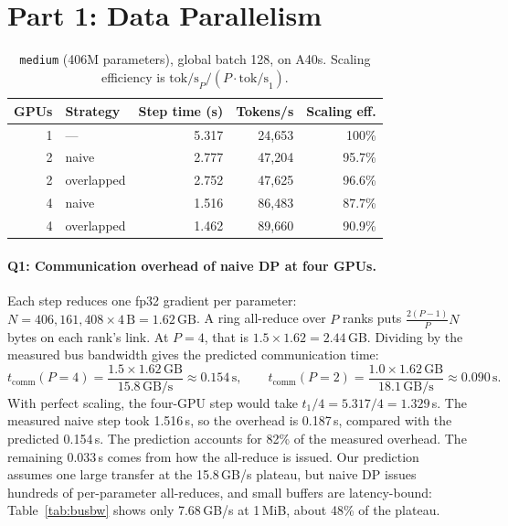 \documentclass[10pt]{article}
\begin{document}
\section{Part 1: Data Parallelism}


\begin{table}[htbp]
\caption{\texttt{medium} (406M parameters), global batch 128, on A40s.
Scaling efficiency is $\text{tok/s}_P / (P \cdot \text{tok/s}_1)$.}
\label{tab:ddp}
\centering
\begin{tabular}{rlrrr}
\toprule
GPUs & Strategy & Step time (s) & Tokens/s & Scaling eff. \\
\midrule
1 & ---        & 5.317 & 24{,}653 & 100\% \\
2 & naive      & 2.777 & 47{,}204 & 95.7\% \\
2 & overlapped & 2.752 & 47{,}625 & 96.6\% \\
4 & naive      & 1.516 & 86{,}483 & 87.7\% \\
4 & overlapped & 1.462 & 89{,}660 & 90.9\% \\
\bottomrule
\end{tabular}
\end{table}


\paragraph{Q1: Communication overhead of naive DP at four GPUs.}
Each step reduces one fp32 gradient per parameter:
$N = 406{,}161{,}408 \times 4\,\text{B} = 1.62\,\text{GB}$.
A ring all-reduce over $P$ ranks puts $\frac{2(P-1)}{P}N$ bytes on each
rank's link. At $P=4$, that is $1.5 \times 1.62 = 2.44$\,GB. Dividing by
the measured bus bandwidth gives the predicted communication time:
\[
t_\text{comm}(P{=}4) = \frac{1.5 \times 1.62\,\text{GB}}{15.8\,\text{GB/s}}
  \approx 0.154\,\text{s},
\qquad
t_\text{comm}(P{=}2) = \frac{1.0 \times 1.62\,\text{GB}}{18.1\,\text{GB/s}}
  \approx 0.090\,\text{s}.
\]
With perfect scaling, the four-GPU step would take
$t_1/4 = 5.317/4 = 1.329$\,s. The measured naive step took 1.516\,s, so the
overhead is 0.187\,s, compared with the predicted 0.154\,s. The prediction accounts
for 82\% of the measured overhead.
The remaining 0.033\,s comes from how the all-reduce is issued. Our
prediction assumes one large transfer at the 15.8\,GB/s plateau, but naive
DP issues hundreds of per-parameter all-reduces, and small buffers are
latency-bound: Table~\ref{tab:busbw} shows only 7.68\,GB/s at 1\,MiB,
about 48\% of the plateau.
\end{document}
